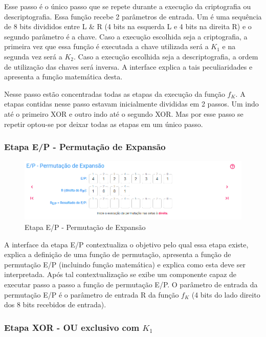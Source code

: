 Esse passo é o único passo que se repete durante a execução da criptografia ou descriptografia. Essa função recebe 2 parâmetros de entrada. Um é uma sequência de 8 bits divididos entre L \& R (4 bits na esquerda L e 4 bits na direita R) e o segundo parâmetro é a chave. Caso a execução escolhida seja a criptografia, a primeira vez que essa função é executada a chave utilizada será a \(K_1\) e na segunda vez será a \(K_2\). Caso a execução escolhida seja a descriptografia, a ordem de utilização das chaves será inversa. A interface explica a tais peculiaridades e apresenta a função matemática desta.

Nesse passo estão concentradas todas as etapas da execução da função \(f_K\). A etapas contidas nesse passo estavam inicialmente divididas em 2 passos. Um indo até o primeiro XOR e outro indo até o segundo XOR. Mas por esse passo se repetir optou-se por deixar todas as etapas em um único passo.

\subsubsection{Etapa E/P - Permutação de Expansão}

\begin{figure}[H]
    \centering
    \caption{Etapa E/P - Permutação de Expansão}
    \includegraphics[width=1\linewidth]{UI/UIEP.png}
\end{figure}

A interface da etapa E/P contextualiza o objetivo pelo qual essa etapa existe, explica a definição de uma função de permutação, apresenta a função de permutação E/P (incluindo função matemática) e explica como esta deve ser interpretada. Após tal contextualização se exibe um componente capaz de executar passo a passo a função de permutação E/P. O parâmetro de entrada da permutação E/P é o parâmetro de entrada R da função \(f_K\) (4 bits do lado direito dos 8 bits recebidos de entrada).

\subsubsection{Etapa XOR - OU exclusivo com \(K_1\)}

